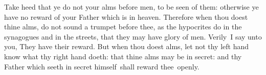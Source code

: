 \documentclass{grattanAlpha}
\begin{document}
Take heed that ye do not your alms before men, to be seen of them: otherwise ye have no reward of your Father which is in heaven. Therefore when thou doest thine alms, do not sound a trumpet before thee, as the hypocrites do in the synagogues and in the streets, that they may have glory of men. Verily~I say unto you, They have their reward.  But when thou doest alms, let not thy left hand know what thy right hand doeth: that thine alms may be in secret: and thy Father which seeth in secret himself~shall reward thee~openly.
\end{document}
